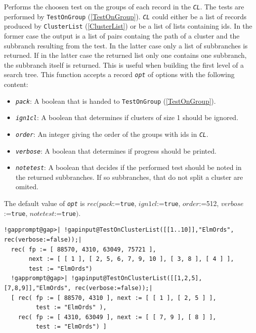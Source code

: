 \documentclass[a4paper,11pt]{report}
\begin{document}
{{{ Performs the choosen test on the groups of each record in the \mbox{\texttt{\mdseries\slshape CL}}. The tests are performed by \texttt{TestOnGroup} (\ref{TestOnGroup}). \mbox{\texttt{\mdseries\slshape CL}} could either be a list of records produced by \texttt{ClusterList} (\ref{ClusterList}) or be a list of lists containing ids. In the former case the output is a list
of pairs containg the path of a cluster and the subbranch resulting from the
test. In the latter case only a list of subbranches is returned. If in the
latter case the returned list only one contains one subbranch, the subbranch
itself is returned. This is useful when building the first level of a search
tree. This function accepts a record \mbox{\texttt{\mdseries\slshape opt}} of options with the following content: 
\begin{itemize}
\item  \mbox{\texttt{\mdseries\slshape pack}}: A boolean that is handed to \texttt{TestOnGroup} (\ref{TestOnGroup}). 
\item  \mbox{\texttt{\mdseries\slshape ign1cl}}: A boolean that determines if clusters of size 1 should be ignored. 
\item  \mbox{\texttt{\mdseries\slshape order}}: An integer giving the order of the groups with ids in \mbox{\texttt{\mdseries\slshape CL}}. 
\item  \mbox{\texttt{\mdseries\slshape verbose}}: A boolean that determines if progress should be printed. 
\item  \mbox{\texttt{\mdseries\slshape notetest}}: A boolean that decides if the performed test should be noted in the returned
subbranches. If so subbranches, that do not split a cluster are omited. 
\end{itemize}
 The default value of \mbox{\texttt{\mdseries\slshape opt}} is $rec(pack$:=\texttt{true}, $ign1cl$:=\texttt{true}, $order$:=512, $verbose$:=\texttt{true}, $notetest$:=\texttt{true}$)$. 
\begin{Verbatim}[commandchars=!@|,fontsize=\small,frame=single,label=Example]
  !gapprompt@gap>| !gapinput@TestOnClusterList([[1..10]],"ElmOrds", rec(verbose:=false));|
  rec( fp := [ 88570, 4310, 63049, 75721 ],
       next := [ [ 1 ], [ 2, 5, 6, 7, 9, 10 ], [ 3, 8 ], [ 4 ] ],
       test := "ElmOrds")
  !gapprompt@gap>| !gapinput@TestOnClusterList([[1,2,5],[7,8,9]],"ElmOrds", rec(verbose:=false));|
  [ rec( fp := [ 88570, 4310 ], next := [ [ 1 ], [ 2, 5 ] ],
         test := "ElmOrds" ),
    rec( fp := [ 4310, 63049 ], next := [ [ 7, 9 ], [ 8 ] ],
         test := "ElmOrds") ]

\end{Verbatim}}}}
\end{document}
